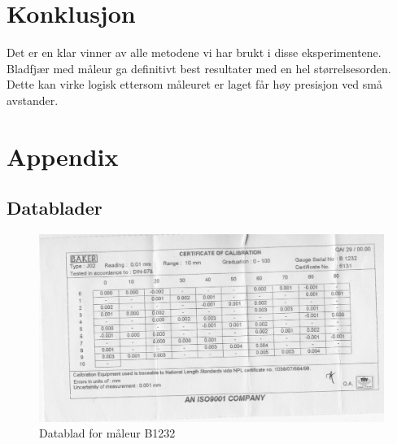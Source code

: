 \documentclass[reprint,norsk,notitlepage]{revtex4-2}
\begin{document}
\section{Konklusjon} \label{sec: conclusion}
Det er en klar vinner av alle metodene vi har brukt i disse eksperimentene. Bladfjær med måleur ga definitivt best resultater med en hel størrelsesorden. Dette kan virke logisk ettersom måleuret er laget får høy presisjon ved små avstander. 


\newpage
\onecolumngrid
\section{Appendix} \label{sec: appendix}
\subsection{Datablader}
\begin{figure}[!ht]
  \centering
  \includegraphics[width = \textwidth]{fig/Maaleur_B1232.PDF}
  \caption{Datablad for måleur B1232}
  \label{fig: datablad maaleur}
\end{figure}
\end{document}
